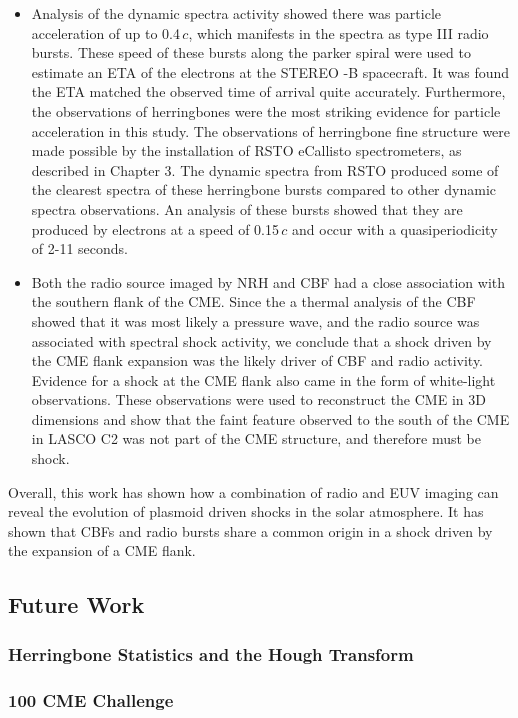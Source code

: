 \begin{itemize}
\item Analysis of the dynamic spectra activity showed there was particle acceleration of up to 0.4\,$c$, which manifests in the spectra as type III radio bursts. These speed of these bursts along the parker spiral were used to estimate an ETA of the electrons at the STEREO -B spacecraft. It was found the ETA matched the observed time of arrival quite accurately. Furthermore, the observations of herringbones were the most striking evidence for particle acceleration in this study. The observations of herringbone fine structure were made possible by the installation of RSTO eCallisto spectrometers, as described in Chapter 3. The dynamic spectra from RSTO produced some of the clearest spectra of these herringbone bursts compared to other dynamic spectra observations. An analysis of these bursts showed that they are produced by electrons at a speed of 0.15\,$c$ and occur with a quasiperiodicity of 2-11 seconds.
\item Both the radio source imaged by NRH and CBF had a close association with the southern flank of the CME. Since the a thermal analysis of the CBF showed that it was most likely a pressure wave, and the radio source was associated with spectral shock activity, we conclude that a shock driven by the CME flank expansion was the likely driver of CBF and radio activity. Evidence for a shock at the CME flank also came in the form of white-light observations. These observations were used to reconstruct the CME in 3D dimensions and show that the faint feature observed to the south of the CME in LASCO C2 was not part of the CME structure, and therefore must be shock.
\end{itemize}
Overall, this work has shown how a combination of radio and EUV imaging can reveal the evolution of plasmoid driven shocks in the solar atmosphere. It has shown that CBFs and radio bursts share a common origin in a shock driven by the expansion of a CME flank.

\subsection{Future Work}

\subsubsection{Herringbone Statistics and the Hough Transform}

\subsubsection{100 CME Challenge}


